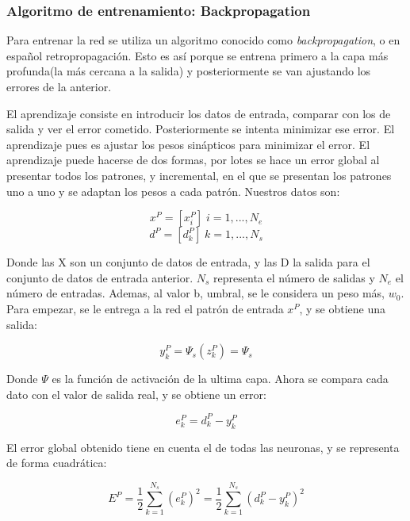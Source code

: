 \documentclass[12pt]{article}
\numberwithin{equation}{section}
\begin{document}
{\subsubsection{Algoritmo de entrenamiento: Backpropagation}
Para entrenar la red se utiliza un algoritmo conocido como \textit{backpropagation}, o en español retropropagación. Esto es así porque se entrena primero a la capa más profunda(la más cercana a la salida) y posteriormente se van ajustando los errores de la anterior.

El aprendizaje consiste en introducir los datos de entrada, comparar con los de salida y ver el error cometido. Posteriormente se intenta minimizar ese error. El aprendizaje pues es ajustar los pesos sinápticos para minimizar el error. El aprendizaje puede hacerse de dos formas, por lotes se hace un error global al presentar todos los patrones, y incremental, en el que se presentan los patrones uno a uno	y se adaptan los pesos a cada patrón. Nuestros datos son:

\begin{equation}
x^P = [x_i^P] \; i= 1,..., N_e
\end{equation}
\begin{equation}
d^P = [d_k^P] \; k=1,...,N_s
\end{equation}

Donde las X son un conjunto de datos de entrada, y las D la salida para el conjunto de datos de entrada anterior. $N_s$ representa el número de salidas y $N_e$ el número de entradas. Ademas, al valor b, umbral, se le considera un peso más, $w_0$. Para empezar, se le entrega a la red el patrón de entrada $x^P$, y se obtiene una salida:

\begin{equation}
y_k^P=\Psi _s(z^P_k)=\Psi _s
\end{equation}

Donde $\Psi$ es la función de activación de la ultima capa. Ahora se compara cada dato con el valor de salida real, y se obtiene un error:

\begin{equation}
e^P_k=d_k^P-y_k^P
\end{equation}

El error global obtenido tiene en cuenta el de todas las neuronas, y se representa de forma cuadrática:

\begin{equation}
E^P = \frac{1}{2} \sum_{k=1}^{N_s} (e_k^P)^2=\frac{1}{2}\sum_{k=1}^{N_s}(d_k^P-y_k^P)^2
\end{equation}

}
\end{document}
